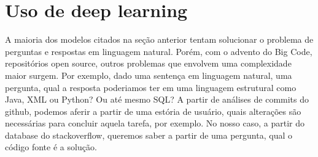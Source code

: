 \section{Uso de deep learning}
\label{sec:uso-deep-learning}

A maioria dos modelos citados na seção anterior tentam solucionar o problema de perguntas e respostas em linguagem natural. Porém, com o advento do Big Code, repositórios open source, outros problemas que envolvem uma complexidade maior surgem. Por exemplo, dado uma sentença em linguagem natural, uma pergunta, qual a resposta poderiamos ter em uma linguagem estrutural como Java, XML ou Python? Ou até mesmo SQL? A partir de análises de commits do github, podemos aferir a partir de uma estória de usuário, quais alterações são necessárias para concluir aquela tarefa, por exemplo. No nosso caso, a partir do database do stackoverflow, queremos saber a partir de uma pergunta, qual o código fonte é a solução.